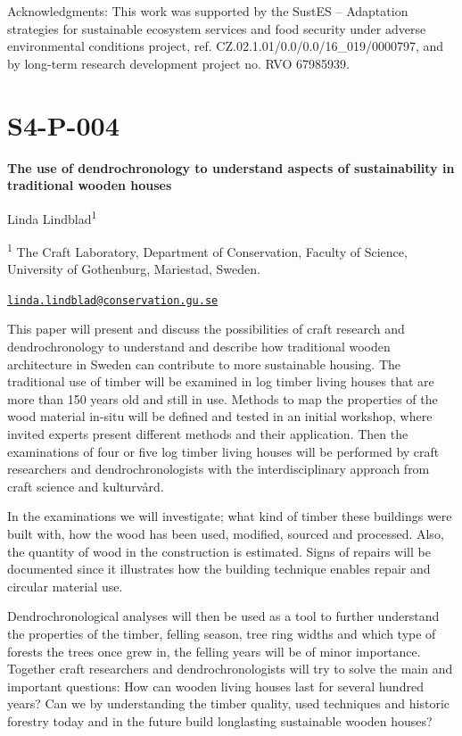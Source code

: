 \documentclass[
]{book}
\begin{document}
Acknowledgments: This work was supported by the SustES -- Adaptation strategies for sustainable ecosystem services and food security under adverse environmental conditions project, ref. CZ.02.1.01/0.0/0.0/16\_019/0000797, and by long-term research development project no. RVO 67985939.

\hypertarget{s4-p-004}{%
\section*{S4-P-004}\label{s4-p-004}}

\textbf{The use of dendrochronology to understand aspects of sustainability in traditional wooden houses}

Linda Lindblad\textsuperscript{1}

\textsuperscript{1} The Craft Laboratory, Department of Conservation, Faculty of Science, University of Gothenburg, Mariestad, Sweden.

\href{mailto:linda.lindblad@conservation.gu.se}{\nolinkurl{linda.lindblad@conservation.gu.se}}

This paper will present and discuss the possibilities of craft research and dendrochronology to understand and describe how traditional wooden architecture in Sweden can contribute to more sustainable housing. The traditional use of timber will be examined in log timber living houses that are more than 150 years old and still in use. Methods to map the properties of the wood material in-situ will be defined and tested in an initial workshop, where invited experts present different methods and their application. Then the examinations of four or five log timber living houses will be performed by craft researchers and dendrochronologists with the interdisciplinary approach from craft science and kulturvård.

In the examinations we will investigate; what kind of timber these buildings were built with, how the wood has been used, modified, sourced and processed. Also, the quantity of wood in the construction is estimated. Signs of repairs will be documented since it illustrates how the building technique enables repair and circular material use.

Dendrochronological analyses will then be used as a tool to further understand the properties of the timber, felling season, tree ring widths and which type of forests the trees once grew in, the felling years will be of minor importance. Together craft researchers and dendrochronologists will try to solve the main and important questions: How can wooden living houses last for several hundred years? Can we by understanding the timber quality, used techniques and historic forestry today and in the future build longlasting sustainable wooden houses?
\end{document}
